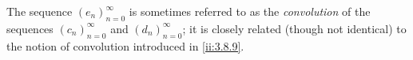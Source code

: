 \begin{rmk}\label{ii:4.4.2}
  The sequence \((e_n)_{n = 0}^\infty\) is sometimes referred to as the \emph{convolution} of the sequences \((c_n)_{n = 0}^\infty\) and \((d_n)_{n = 0}^\infty\);
  it is closely related (though not identical) to the notion of convolution introduced in \cref{ii:3.8.9}.
\end{rmk}
